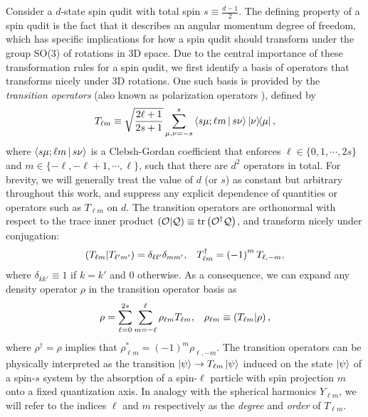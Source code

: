 \documentclass[notitlepage,twocolumn]{revtex4-2}
\newcommand{\f}[2]{\dfrac{#1}{#2}} %
\newcommand{\p}[1]{\left(#1\right)} %
\renewcommand{\set}[1]{\{#1\}} %
\newcommand{\bk}{\Braket} %
\newcommand{\1}{\mathds{1}}
\renewcommand{\O}{\mathcal{O}}
\newcommand{\Q}{\mathcal{Q}}
\def\obk#1{\mathinner{({#1})}}
\begin{document}
Consider a $d$-state spin qudit with total spin $s\equiv\frac{d-1}{2}$.
The defining property of a spin qudit is the fact that it describes an angular momentum degree of freedom, which has specific implications for how a spin qudit should transform under the group SO(3) of rotations in 3D space.
Due to the central importance of these transformation rules for a spin qudit, we first identify a basis of operators that transforms nicely under 3D rotations.
One such basis is provided by the {\it transition operators} (also known as polarization operators \cite{kryszewski2006positivity, bertlmann2008bloch}), defined by
\begin{align}
  T_{\ell m} \equiv \sqrt{\f{2\ell+1}{2s+1}} \sum_{\mu,\nu=-s}^s
  \bk{s\mu;\ell m|s\nu} \op{\nu}{\mu},
  \label{eq:trans_op}
\end{align}
where $\bk{s\mu;\ell m|s\nu}$ is a Clebsh-Gordan coefficient that enforces $\ell\in\set{0,1,\cdots,2s}$ and $m\in\set{-\ell,-\ell+1,\cdots,\ell}$, such that there are $d^2$ operators in total.
For brevity, we will generally treat the value of $d$ (or $s$) as constant but arbitrary throughout this work, and suppress any explicit dependence of quantities or operators such as $T_{\ell m}$ on $d$.
The transition operators are orthonormal with respect to the trace inner product $\obk{\O|\Q}\equiv\tr\p{\O^\dag\Q}$, and transform nicely under conjugation:
\begin{align}
  \obk{T_{\ell m }|T_{\ell'm'}}
  = \delta_{\ell\ell'} \delta_{mm'},
  &&
  T_{\ell m}^\dag = \p{-1}^m T_{\ell,-m},
\end{align}
where $\delta_{kk'}\equiv 1$ if $k=k'$ and $0$ otherwise.
As a consequence, we can expand any density operator $\rho$ in the transition operator basis as
\begin{align}
  \rho = \sum_{\ell=0}^{2s} \sum_{m=-\ell}^\ell \rho_{\ell m} T_{\ell m},
  &&
  \rho_{\ell m}\equiv\obk{T_{\ell m}|\rho},
  \label{eq:trans_state}
\end{align}
where $\rho^\dag=\rho$ implies that $\rho_{\ell m}^*=\p{-1}^m\rho_{\ell,-m}$.
The transition operators can be physically interpreted as the transition $\ket\psi\to T_{\ell m}\ket\psi$ induced on the state $\ket\psi$ of a spin-$s$ system by the absorption of a spin-$\ell$ particle with spin projection $m$ onto a fixed quantization axis.
In analogy with the spherical harmonics $Y_{\ell m}$, we will refer to the indices $\ell$ and $m$ respectively as the {\it degree} and {\it order} of $T_{\ell m}$.
\end{document}
